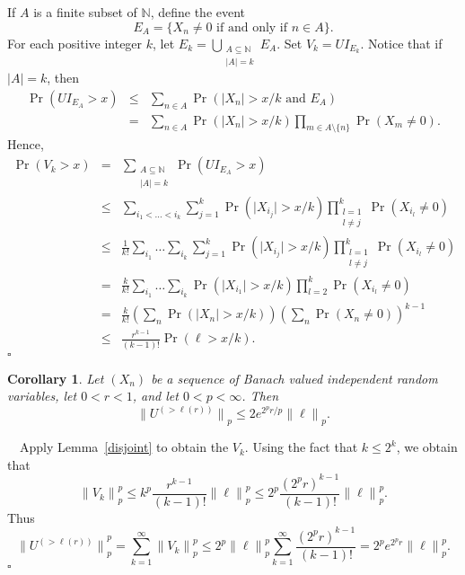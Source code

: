 \documentclass[12pt]{article}
\newtheorem{cor}[thm]{Corollary}
\newcommand{\N}{{\mathbb N}}
\newcommand{\smodo}[1]{{\mathopen|#1\mathclose|}}
\newcommand{\snormo}[1]{{\mathopen\|#1\mathclose\|}}
\newcommand{\Proof}{\medskip\noindent{\bf Proof:}\ \ }
\newcommand{\qed}{\leavevmode\unskip\penalty9999
                  \hbox{}\nobreak\hfill$\square$\goodbreak\medskip}
\begin{document}
If $A$ is a finite subset of $\N$, define the event 
$$ E_A = \{ X_n \ne 0\text{ if and only if } n \in A \} .$$ For each
positive integer $k$, let $E_k = \bigcup_{\substack{A \subseteq \N \\ \smodo
A = k}} 
E_A$. Set $V_k = U I_{E_k}$. Notice that if $\smodo A = k$, then 
\begin{eqnarray*}
  \Pr(U I_{E_A} > x) 
  &\le& \sum_{n \in A}
        \Pr(\smodo{X_n} > x/k\text{ and } E_A) \\
  &=& \sum_{n\in A} \Pr(\smodo{X_n} > x/k) \prod_{m \in A \setminus\{n\}}
      \Pr(X_m \ne 0) . 
\end{eqnarray*}
Hence, 
\begin{eqnarray*}
  \Pr(V_k > x) 
  &=& \sum_{\substack{A \subseteq \N \\ \smodo A = k}}\Pr(U I_{E_A} > x) \\
  &\le& \sum_{i_1 < \dots < i_k} \sum_{j=1}^k \Pr(\smodo{X_{i_j}} > x/k) 
        \prod_{\substack{l=1 \\ l\ne j}}^k \Pr(X_{i_l} \ne 0) \\ 
  &\le& {\frac{1}{ k!}} 
        \sum_{i_1} \dots \sum_{i_k}\sum_{j=1}^k \Pr(\smodo{X_{i_j}} > x/k) 
        \prod_{\substack{l=1 \\ l\ne j}}^k \Pr(X_{i_l} \ne 0) \\
  &=& {\frac{k }{ k!}}
      \sum_{i_1} \dots \sum_{i_k}\Pr(\smodo{X_{i_1}} > x/k)
      \prod_{l=2}^k \Pr(X_{i_l} \ne 0) \\
  &=& {\frac{k }{ k!}} 
      \left(\sum_n 
      \Pr(\smodo{X_n} > x/k) \right)\left(\sum_n \Pr(X_n \ne 0)\right)^{k-1} \\
  &\le& {\frac{r^{k-1} }{ (k-1)!}} \Pr(\ell > x/k) . 
\end{eqnarray*} 
\qed

\begin{cor}
\label{disjoint-lp}
Let $(X_n)$ be a sequence of Banach valued independent random 
variables, let $0<r<1$, and let $0<p<\infty$.  Then
$$ \snormo{U^{(>\ell(r))}}_p \le 2 e^{2^p r/p} \snormo \ell_p .$$
\end{cor}

\Proof  Apply Lemma~\ref{disjoint} to obtain the $V_k$.  
Using the fact that $k \le 2^k$, we obtain that
$$ \snormo{V_k}_p^p
   \le k^p {\frac{r^{k-1}}{ (k-1)!}} \snormo{\ell}_p^p 
   \le 2^p {\frac{(2^p r)^{k-1}}{ (k-1)!}} \snormo{\ell}_p^p .$$
Thus 
$$ \snormo {U^{(>\ell(r))}}_p^p 
   = \sum_{k=1}^\infty \snormo{V_k}_p^p
  \le 2^p \snormo\ell_p^p \sum_{k=1}^\infty {\frac{(2^p r)^{k-1}}{ (k-1)!}}
  = 2^p e^{2^p r} \snormo\ell_p^p .$$ 
\qed
\end{document}
